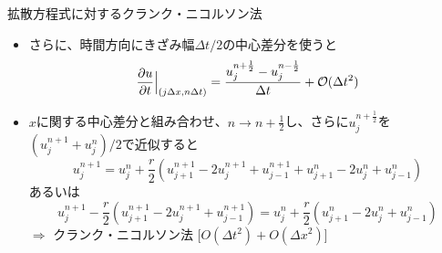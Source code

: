 \begin{frame}[t]{拡散方程式に対するクランク・ニコルソン法}
  \begin{itemize}
  \item さらに、時間方向にきざみ幅$\Delta t/2$の中心差分を使うと
    \[
    \frac{\partial u}{\partial t} \Big|_{(j \Delta x, n \Delta t)} = \frac{u_j^{n+\frac{1}{2}} - u_j^{n-\frac{1}{2}}}{\Delta t} + {\cal O}(\Delta t^2)
    \]
  \item $x$に関する中心差分と組み合わせ、$n \rightarrow n+\frac{1}{2}$し、さらに$u_j^{n+\frac{1}{2}}$を$(u_j^{n+1}+u_j^{n})/2$で近似すると
    \[
    u_{j}^{n+1} = u_{j}^{n} + \frac{r}{2} (u_{j+1}^{n+1} - 2 u_{j}^{n+1}  +u_{j-1}^{n+1} + u_{j+1}^{n} - 2 u_{j}^{n} + u_{j-1}^{n})
    \]
    あるいは
    \[
    u_{j}^{n+1} - \frac{r}{2} (u_{j+1}^{n+1} - 2 u_{j}^{n+1} + u_{j-1}^{n+1}) = u_{j}^{n} + \frac{r}{2} (u_{j+1}^{n} - 2 u_{j}^{n} + u_{j-1}^{n})
    \]
    $\Rightarrow$ クランク・ニコルソン法 [$O(\Delta t^2) + O(\Delta x^2)$]
  \end{itemize}
\end{frame}
